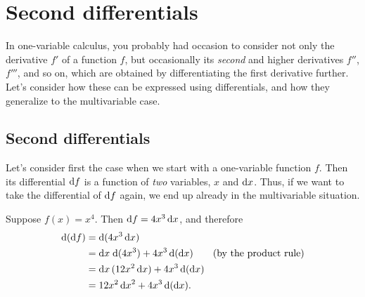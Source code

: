 \ifdefined\inmaster\else\def\subonly{\jobname}\fi

\chapter{Second differentials}
\label{cha:second-differentials}

In one-variable calculus, you probably had occasion to consider not only the derivative $f'$ of a function $f$, but occasionally its \emph{second} and higher derivatives $f''$, $f'''$, and so on, which are obtained by differentiating the first derivative further.
Let's consider how these can be expressed using differentials, and how they generalize to the multivariable case.

\section{Second differentials}
\label{sec:second-differentials}

Let's consider first the case when we start with a one-variable function $f$.
Then its differential ${\mathrm{d} f}$ is a function of \emph{two} variables, $x$ and ${\mathrm{d} x}$.
Thus, if we want to take the differential of ${\mathrm{d} f}$ again, we end up already in the multivariable situation.

\begin{eg}
  Suppose $f(x) = x^4$.  Then ${\mathrm{d} f} = 4x^3 \,{\mathrm{d} x}$, and therefore
  \begin{align*}
    \mathrm{d}({\mathrm{d} f}) &= \mathrm{d}(4x^3 \,{\mathrm{d} x})\\
    &= {\mathrm{d} x} \;\mathrm{d}(4x^3) + 4x^3 \, \mathrm{d}({\mathrm{d} x}) \qquad\text{(by the product rule)}\\
    &= {\mathrm{d} x} \,(12x^2\,{\mathrm{d} x}) + 4x^3 \, \mathrm{d}({\mathrm{d} x})\\
    &= 12x^2\,{\mathrm{d} x}^2 + 4x^3 \, \mathrm{d}({\mathrm{d} x}).
  \end{align*}
\end{eg}


